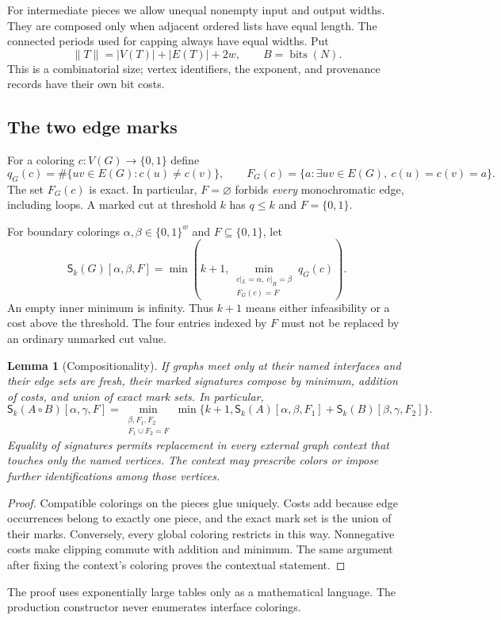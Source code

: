 \documentclass[11pt]{article}
\newtheorem{lemma}[theorem]{Lemma}
\theoremstyle{remark}\newtheorem{remark}[theorem]{Remark}
\newcommand{\Sig}{\mathsf S}
\newcommand{\bits}{\operatorname{bits}}
\newcommand{\size}[1]{\lVert #1\rVert}
\begin{document}
For intermediate pieces we allow unequal nonempty input and output widths. They are composed only when adjacent ordered lists have equal length. The connected periods used for capping always have equal widths. Put
\[
 \size{T}=|V(T)|+|E(T)|+2w,\qquad B=\bits(N).
\]
This is a combinatorial size; vertex identifiers, the exponent, and provenance records have their own bit costs.

\subsection{The two edge marks}
For a coloring $c:V(G)\to\{0,1\}$ define
\[
 q_G(c)=\#\{uv\in E(G):c(u)\ne c(v)\},\qquad
 F_G(c)=\{a:\exists uv\in E(G),\ c(u)=c(v)=a\}.
\]
The set $F_G(c)$ is exact. In particular, $F=\varnothing$ forbids \emph{every} monochromatic edge, including loops. A marked cut at threshold $k$ has $q\le k$ and $F=\{0,1\}$.

For boundary colorings $\alpha,\beta\in\{0,1\}^w$ and $F\subseteq\{0,1\}$, let
\begin{equation}\label{eq:signature}
 \Sig_k(G)[\alpha,\beta,F]
 =\min\left(k+1,\min_{\substack{c|_L=\alpha,\ c|_R=\beta\\F_G(c)=F}}q_G(c)\right).
\end{equation}
An empty inner minimum is infinity. Thus $k+1$ means either infeasibility or a cost above the threshold. The four entries indexed by $F$ must not be replaced by an ordinary unmarked cut value.

\begin{lemma}[Compositionality]\label{lem:compose}
If graphs meet only at their named interfaces and their edge sets are fresh, their marked signatures compose by minimum, addition of costs, and union of exact mark sets. In particular,
\[
 \Sig_k(A\circ B)[\alpha,\gamma,F]
 =\min_{\substack{\beta,F_1,F_2\\F_1\cup F_2=F}}
 \min\{k+1,\Sig_k(A)[\alpha,\beta,F_1]+\Sig_k(B)[\beta,\gamma,F_2]\}.
\]
Equality of signatures permits replacement in every external graph context that touches only the named vertices. The context may prescribe colors or impose further identifications among those vertices.
\end{lemma}
\begin{proof}
Compatible colorings on the pieces glue uniquely. Costs add because edge occurrences belong to exactly one piece, and the exact mark set is the union of their marks. Conversely, every global coloring restricts in this way. Nonnegative costs make clipping commute with addition and minimum. The same argument after fixing the context's coloring proves the contextual statement.
\end{proof}
The proof uses exponentially large tables only as a mathematical language. The production constructor never enumerates interface colorings.
\end{document}
